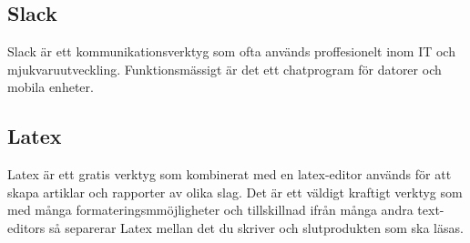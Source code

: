\subsection*{Slack}
Slack är ett kommunikationsverktyg som ofta används proffesionelt inom IT och mjukvaruutveckling. Funktionsmässigt är det ett chatprogram för datorer och mobila enheter.

\subsection*{Latex}
Latex är ett gratis verktyg som kombinerat med en latex-editor används för att skapa artiklar och rapporter av olika slag. Det är ett väldigt kraftigt verktyg som med många formateringsmmöjligheter och tillskillnad ifrån många andra text-editors så separerar Latex mellan det du skriver och slutprodukten som ska läsas.